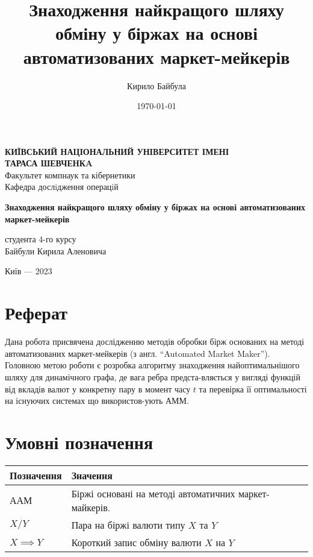 \documentclass[a4paper, 12pt]{article}
\author{Кирило Байбула}
\date{\today}
\title{Знаходження найкращого шляху обміну у біржах на основі автоматизованих маркет-мейкерів}
\newcommand{\tqs}{\textquotesingle}
\begin{document}
\begin{titlepage}
	\begin{center}
		\vspace*{1cm}

		\textbf{КИЇВСЬКИЙ НАЦІОНАЛЬНИЙ УНІВЕРСИТЕТ ІМЕНІ \\ ТАРАСА ШЕВЧЕНКA} \\
		Факультет комп наук та кібернетики \\
		Кафедра дослiдження операцiй

		\vspace{2.0cm}
		\textbf{Знаходження найкращого шляху обміну у біржах на основі автоматизованих маркет-мейкерів} \\
		\vspace{1.5cm}
		\begin{flushright}
			студента 4-го курсу \\
			Байбули Кирила Аленовича
		\end{flushright}

		\vfill

		\vspace{0.8cm}
		Київ ---  2023
	\end{center}
\end{titlepage}
\newpage


\section{Реферат}\label{sec:abstract}

Дана робота присвячена дослідженню методів обробки бірж основаних на методі
автоматизованих маркет-мейкерів (з англ. ``Automated Market Maker''). Головною
метою роботи є розробка алгоритму знаходження найоптимальнішого шляху для
динамічного графа, де вага ребра предста-вляється у вигляді функцій від вкладів
валют у конкретну пару в момент часу \(t\) та перевірка її оптимальності на
існуючих системах що використов-ують АММ.

\newpage

\tableofcontents
\newpage

\section*{Умовні позначення}\label{sec:notation}

\begin{center}
	\begin{tabular}{ll}
		Позначення       & Значення                                               \\[0pt]
		\hline
		ААМ              & Біржі основані на методі автоматичних маркет-майкерів. \\[0pt]
		\(X/Y\)          & Пара на біржі валюти типу \(X\) та \(Y\)               \\[0pt]
		\(X \implies Y\) & Короткий запис обміну валюти \(X\) на \(Y\)            \\[0pt]
	\end{tabular}
\end{center}
\end{document}
